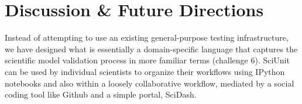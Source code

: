 \documentclass[9pt]{sig-alternate}
\newcommand{\verbx}[1]{\lstinline{#1}}
\begin{document}
%

\vspace{5px}
\section{Discussion \& Future Directions}\label{discussion}
Instead of attempting to use an existing general-purpose testing infrastructure, we have designed what is essentially a domain-specific language that captures the scientific model validation process in more familiar terms (challenge 6). SciUnit can be used by individual scientists to organize their workflows using IPython notebooks \cite{perez2007ipython} and also within a loosely collaborative workflow, mediated by a social coding tool like Github and a simple portal, SciDash.

\end{document}
